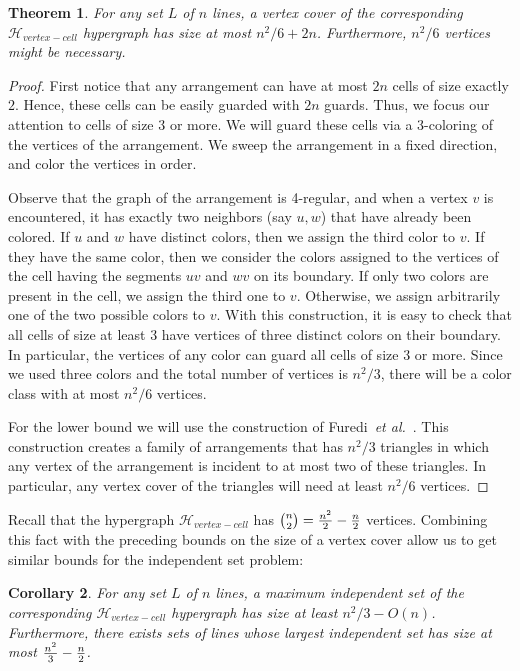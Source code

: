 \documentclass[11pt,a4paper]{article}
\newtheorem{theorem}{Theorem}
\newtheorem{corollary}[theorem]{Corollary}
\newcommand{\Hvertexcell}{{\mathcal H}_{vertex-cell}}
\begin{document}
\begin{theorem}\label{LB:guards}
For any set $L$ of $n$ lines, a vertex cover of the corresponding $\Hvertexcell$ hypergraph has size at most ${n^2}/6+2n$. Furthermore, $n^2/6$ vertices might be necessary.
\end{theorem}
\begin{proof}
First notice that any arrangement can have at most $2n$ cells of size exactly $2$. Hence, these cells can be easily guarded with $2n$ guards. Thus, we focus our attention to cells of size $3$ or more. We will guard these cells via a 3-coloring of the vertices of the arrangement. We sweep the arrangement in a fixed direction, and color the vertices in order. 

Observe that the graph of the arrangement is 4-regular, and when a vertex $v$ is encountered, it has exactly two neighbors (say $u,w$) that have already been colored. If $u$ and $w$ have distinct colors, then we assign the third color to $v$. If they have the same color, then we consider the colors assigned to the vertices of the cell having the segments $uv$ and $wv$ on its boundary. If only two colors are present in the cell, we assign the third one to $v$. Otherwise, we assign arbitrarily one of the two possible colors to $v$. With this construction, it is easy to check that all cells of size at least 3 have vertices of three distinct colors on their boundary. In particular, the vertices of any color can guard all cells of size $3$ or more. Since we used three colors and the total number of vertices is $n^2/3$, there will be a color class with at most $n^2/6$ vertices.

For the lower bound we will use the construction of Furedi~\emph{et al.}~\cite{furedi}. This construction creates a family of arrangements that has $n^{2}/3$ triangles in which any vertex of the arrangement is incident to at most two of these triangles. In particular, any vertex cover of the triangles will need at least $n^2/6$ vertices.
\end{proof}

Recall that the hypergraph $\Hvertexcell$ has ${n\choose 2} ={n^2 \over 2} -{n \over 2}$ vertices. Combining this fact with the preceding bounds on the size of a vertex cover allow us to get similar bounds for the independent set problem:  
\begin{corollary}\label{cor:VCIS}
For any set $L$ of $n$ lines, a maximum independent set of the corresponding $\Hvertexcell$ hypergraph has size at least ${n^2}/3-O(n)$. Furthermore, there exists sets of lines whose largest independent set has size at most ${n^2\over 3} - {n\over 2}$.
\end{corollary}
\end{document}
